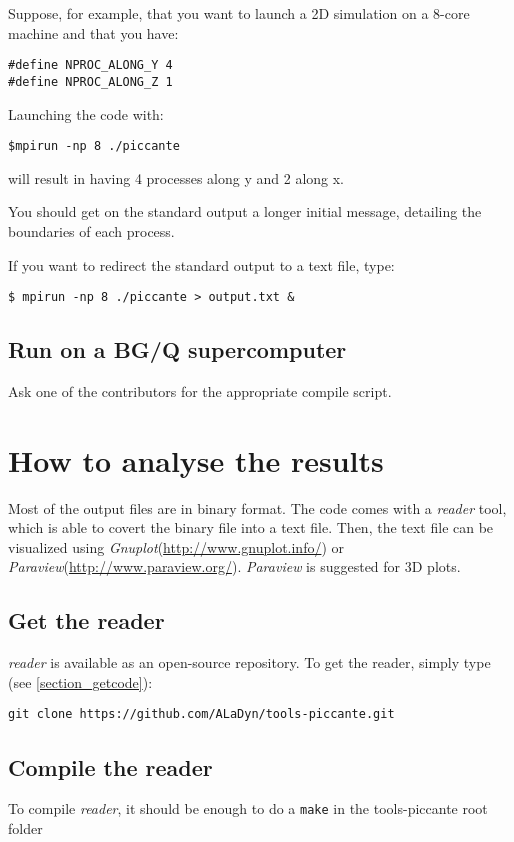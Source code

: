 \documentclass[11pt,a4paper]{report}
\begin{document}
Suppose, for example, that you want to launch a 2D simulation on a 8-core machine and that you have:
\begin{lstlisting}
#define NPROC_ALONG_Y 4
#define NPROC_ALONG_Z 1
\end{lstlisting}
Launching the code with:
\begin{verbatim}
$mpirun -np 8 ./piccante
\end{verbatim}
will result in having 4 processes along y and 2 along x.

You should get on the standard output a longer initial message, detailing the boundaries of each process.

If you want to redirect the standard output to a text file, type:

\begin{verbatim}
$ mpirun -np 8 ./piccante > output.txt &
\end{verbatim}

\section{Run on a BG/Q supercomputer}
Ask one of the contributors for the appropriate compile script.

\chapter{How to analyse the results}\label{chapter_howtoanalyse}
Most of the output files are in binary format. The code comes with a \emph{reader} tool, which is able to covert the binary file into a text file. Then, the text file can be visualized using \emph{Gnuplot}(\url{http://www.gnuplot.info/}) or \emph{Paraview}(\url{http://www.paraview.org/}). \emph{Paraview} is suggested for 3D plots.

\section{Get the reader}
\emph{reader} is available as an open-source repository. To get the reader, simply type (see \ref{section_getcode}):
\begin{verbatim}
git clone https://github.com/ALaDyn/tools-piccante.git
\end{verbatim}

\section{Compile the reader}
To compile \emph{reader}, it should be enough to do a \verb+make+ in the tools-piccante root folder
\end{document}

